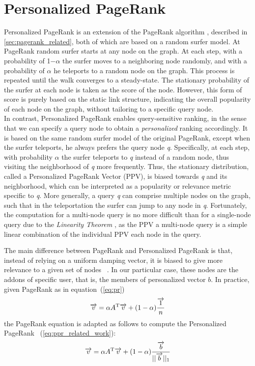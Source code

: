 \documentclass[11pt,oneside]{book}
\let\Oldsection\section
\renewcommand{\section}{\FloatBarrier\Oldsection}
\begin{document}
\section{Personalized PageRank}
Personalized PageRank is an extension of the PageRank algorithm \cite{page1999pagerank}, described in \autoref{sec:pagerank_related}, both of which are based on a random surfer model. At PageRank random surfer starts at any node on the graph. At each step, with a probability of 1−$\alpha$ the surfer moves to a neighboring node randomly, and with a probability of $\alpha$ he teleports to a random node on the graph. This process is repeated until the walk converges to a steady-state. The stationary probability of the surfer at each node is taken as the score of the node. However, this form of score is purely based on the static link structure, indicating the overall popularity of each node on the graph, without tailoring to a specific query node.\\
In contrast, Personalized PageRank enables query-sensitive ranking,
in the sense that we can specify a query node to obtain a \textit{personalized}
ranking accordingly. It is based on the same random surfer model of the original PageRank, except when the surfer teleports, he always prefers the query node \textit{q}. Specifically, at each step, with probability $\alpha$ the surfer teleports to \textit{q} instead of a random node, thus visiting the neighborhood of \textit{q} more frequently. Thus, the stationary distribution, called a Personalized PageRank Vector (PPV), is biased towards \textit{q} and its neighborhood, which can be interpreted as a popularity or relevance metric specific to \textit{q}.
More generally, a query \textit{q} can comprise multiple nodes on the
graph, such that in the teleportation the surfer can jump to any node in \textit{q}. Fortunately, the computation for a multi-node query is no more difficult than for a single-node query due to the \textit{Linearity Theorem} \citep{jeh2003scaling}, as the PPV a multi-node query is a simple linear combination of the individual PPV each node in the query.

The main difference between PageRank and Personalized PageRank is that, instead of relying on a uniform damping vector, it is biased to give more relevance to a given set of nodes ~\cite{haveliwala2003topic}. In our particular case, these 
nodes are the addons of specific user, that is, the 
members of personalized vector $b$. In practice, given PageRank as in equation~(\ref{eq:pr})
			\begin{equation}
				\overrightarrow{v} = \alpha A^{\rm T}\overrightarrow{v}
				+ (1-\alpha)\frac{\overrightarrow{1}}{n}
				\label{eq:pr}
			\end{equation}
the PageRank equation is adapted as follows to compute the Personalized PageRank ~(\ref{eq:ppr_related_work}):
			\begin{equation}
				\overrightarrow{v} = \alpha A^{\rm T}\overrightarrow{v}
				+ (1-\alpha)\frac{\overrightarrow{b}}{||\overrightarrow{b}||_1}
				\label{eq:ppr_related_work}
			\end{equation}
\end{document}
